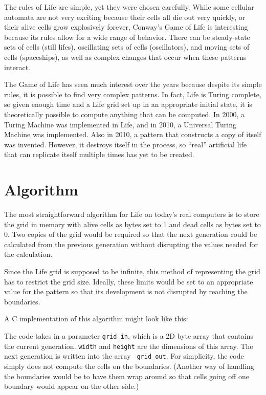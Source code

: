 \documentclass[letterpaper,12pt]{article}
\begin{document}
The rules of Life are simple, yet they were chosen carefully.  While some
cellular automata are not very exciting because their cells all die out very
quickly, or their alive cells grow explosively forever, Conway's Game of Life is
interesting because its rules allow for a wide range of behavior.  There can be
steady-state sets of cells (still lifes), oscillating sets of cells
(oscillators), and moving sets of cells (spaceships), as well as complex changes
that occur when these patterns interact.\cite{gol}

The Game of Life has seen much interest over the years because despite its
simple rules, it is possible to find very complex patterns.  In fact, Life is
Turing complete, so given enough time and a Life grid set up in an appropriate
initial state, it is theoretically possible to compute anything that can be
computed.  In 2000, a Turing Machine was implemented in Life,\cite{tm} and in
2010, a Universal Turing Machine was implemented.\cite{utm}  Also in 2010, a
pattern that constructs a copy of itself was invented.  However, it destroys
itself in the process, so ``real'' artificial life that can replicate itself
multiple times has yet to be created.\cite{constructor}

\section{Algorithm}

The most straightforward algorithm for Life on today's real computers is to
store the grid in memory with alive cells as bytes set to 1 and dead cells as
bytes set to 0.  Two copies of the grid would be required so that the next
generation could be calculated from the previous generation without disrupting
the values needed for the calculation.

Since the Life grid is supposed to be infinite, this method of representing the
grid has to restrict the grid size.  Ideally, these limits would be set to an
appropriate value for the pattern so that its development is not disrupted by
reaching the boundaries. 

A C implementation of this algorithm might look like this:



The code takes in a parameter {\tt grid\_in}, which is a 2D byte array that
contains the current generation.  {\tt width} and {\tt height} are the
dimensions of this array. The next generation is written into the array {\tt
grid\_out}.  For simplicity, the code simply does not compute the cells on the
boundaries. (Another way of handling the boundaries would be to
have them wrap around so that cells going off one boundary would appear on the
other side.)
\end{document}
